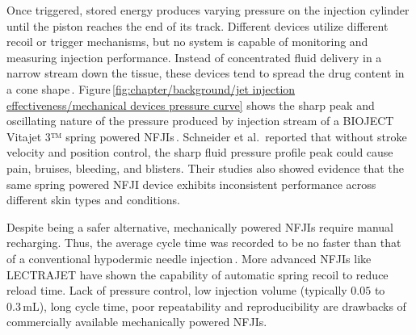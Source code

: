         Once triggered, stored energy produces varying pressure on the injection cylinder until the piston reaches the end of its track. Different devices utilize different recoil or trigger mechanisms, but no system is capable of monitoring and measuring injection performance. Instead of concentrated fluid delivery in a narrow stream down the tissue, these devices tend to spread the drug content in a cone shape\,\cite{baxtex2005}. Figure\,\ref{fig:chapter/background/jet injection effectiveness/mechanical devices pressure curve} shows the sharp peak and oscillating nature of the pressure produced by injection stream of a BIOJECT Vitajet 3™ spring powered \acsp{NFJI}\,\cite{schramm2002}. Schneider et al.\,\cite{schneider1994} reported that without stroke velocity and position control, the sharp fluid pressure profile peak could cause pain, bruises, bleeding, and blisters. Their studies also showed evidence that the same spring powered NFJI device exhibits inconsistent performance across different skin types and conditions. 
        
        Despite being a safer alternative, mechanically powered \acsp{NFJI} require manual recharging. Thus, the average cycle time was recorded to be no faster than that of a conventional hypodermic needle injection\,\cite{PharmaJet2011}. More advanced \acsp{NFJI} like LECTRAJET  have shown the capability of automatic spring recoil to reduce reload time. Lack of pressure control, low injection volume (typically $0.05$ to $0.3\,\mathrm{mL}$), long cycle time, poor repeatability and reproducibility are drawbacks of commercially available mechanically powered \acsp{NFJI}.
        
